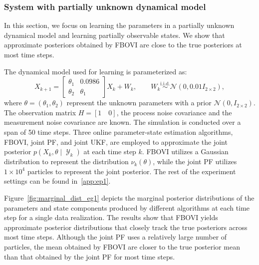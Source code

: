 \documentclass[preprint,3p,times]{elsarticle}
\DeclareMathOperator{\Y}{\mathcal{Y}}
\begin{document}
\subsubsection{System with partially unknown dynamical model}
\label{sec:pendulum_part1}
In this section, we focus on learning the parameters in a partially unknown dynamical model and learning partially observable states. We show that approximate posteriors obtained by FBOVI are close to the true posteriors at most time steps. 

The dynamical model used for learning is parameterized as:
\begin{equation}
X_{k+1} = \begin{bmatrix}\theta_1&0.0986\\ \theta_2&\theta_1\end{bmatrix}X_k + W_k, \qquad W_k \overset{\mathrm{i.i.d.}}{\sim} \mathcal{N}(0,0.01I_{2\times2}),
\end{equation}
where $\theta=(\theta_1,\theta_2)$ represent the unknown parameters with a prior ${\mathcal{N}}(0,I_{2\times2})$. The observation matrix $H=[1 \quad 0]$, the process noise covariance and the measurement noise covariance are known.
The simulation is conducted over a span of 50 time steps. Three online parameter-state estimation algorithms, FBOVI, joint PF, and joint UKF, are employed to approximate the joint posterior $p(X_k,\theta \mid \Y_k)$ at each time step $k$. FBOVI utilizes a Gaussian distribution to represent the distribution $\nu_k(\theta)$, while the joint PF utilizes $1\times 10^4$ particles to represent the joint posterior. The rest of the experiment settings can be found in~\ref{app:ep1}.

Figure~\ref{fig:marginal_dist_eg1} depicts the marginal posterior distributions of the parameters and state components produced by different algorithms at each time step for a single data realization. The results show that FBOVI yields approximate posterior distributions that closely track the true posteriors across most time steps. Although the joint PF uses a relatively large number of particles, the mean obtained by FBOVI are closer to the true posterior mean than that obtained by the joint PF for most time steps.
\end{document}
